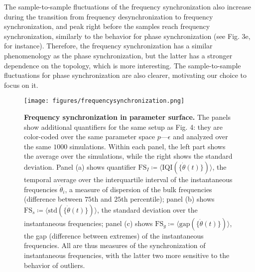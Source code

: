 \documentclass[reprint,onecolumn,superscriptaddress,showpacs,amsmath,amssymb,aps,prx,floatfix,]{revtex4-2}
\newcommand*{\walrus}{\ensuremath{\coloneqq}}
\begin{document}
The sample-to-sample fluctuations of the frequency synchronization also increase during the transition from frequency desynchronization to frequency synchronization, and peak right before the samples reach frequency synchronization, similarly to the behavior for phase synchronization (see Fig. 3e, for instance). Therefore, the frequency synchronization has a similar phenomenology as the phase synchronization, but the latter has a stronger dependence on the topology, which is more interesting. The sample-to-sample fluctuations for phase synchronization are also clearer, motivating our choice to focus on it.


%
\begin{figure*}[htb]
    \centering
    \texttt{[image: figures/frequencysynchronization.png]}
    \caption{\textbf{Frequency synchronization in parameter surface.}  The panels show additional quantifiers for the same setup as Fig. 4: they are color-coded over the same parameter space $p \text{---} \epsilon$ and analyzed over the same $1000$ simulations. Within each panel, the left part shows the average over the simulations, while the right shows the standard deviation. Panel (a) shows quantifier $\mathrm{FS}_I \walrus \langle \mathrm{IQI}(\{\dot{\theta}(t)\}) \rangle$, the temporal average over the interquartile interval of the instantaneous frequencies $\dot{\theta}_i$, a measure of dispersion of the bulk frequencies (difference between $75$th and $25$th percentile); panel (b) shows $\mathrm{FS}_s \walrus \langle \mathrm{std}(\{\dot{\theta}(t)\}) \rangle$, the standard deviation over the instantaneous frequencies; panel (c) shows $\mathrm{FS}_g \walrus \langle \mathrm{gap}(\{\dot{\theta}(t)\}) \rangle$, the gap (difference between extremes) of the instantaneous frequencies. All are thus measures of the synchronization of instantaneous frequencies, with the latter two more sensitive to the behavior of outliers.
    }
    \label{sup:fig:additionalsurfaces}
\end{figure*}
\end{document}
